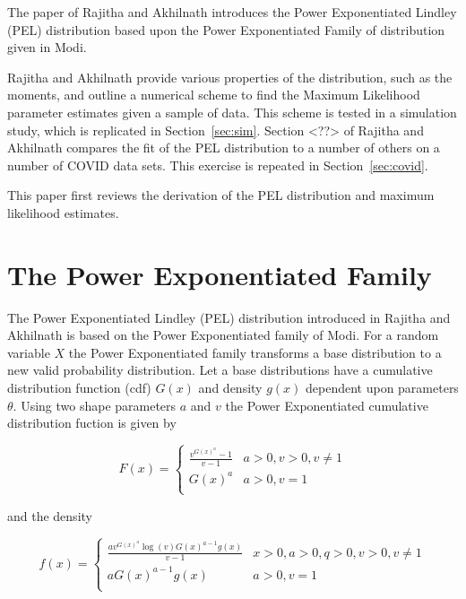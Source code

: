 The paper of Rajitha and Akhilnath\supercite{Rajitha2022} introduces the Power Exponentiated Lindley (PEL) distribution based upon the Power Exponentiated Family of distribution given in Modi\supercite{Modi}.

Rajitha and Akhilnath\supercite{Rajitha2022} provide various properties of the distribution, such as the moments, and outline a numerical scheme to find the Maximum Likelihood parameter estimates given a sample of data. This scheme is tested in a simulation study, which is replicated in Section~\ref{sec:sim}. Section <??> of Rajitha and Akhilnath\supercite{Rajitha2022} compares the fit of the PEL distribution to a number of others on a number of COVID data sets. This exercise is repeated in Section~\ref{sec:covid}.

This paper first reviews the derivation of the PEL distribution and maximum likelihood estimates.


\section{The Power Exponentiated Family}

The Power Exponentiated Lindley (PEL) distribution introduced in Rajitha and Akhilnath\supercite{Rajitha2022} is based on the Power Exponentiated family of Modi\supercite{Modi}. For a random variable $X$ the Power Exponentiated family transforms a base distribution to a new valid probability distribution. Let a base distributions have a cumulative distribution function (cdf) $G\left(x\right)$ and density $g\left(x\right)$ dependent upon parameters $\theta$. Using two shape parameters $a$ and $v$ the Power Exponentiated cumulative distribution fuction is given by

\begin{equation}
  F\left(x\right) = \left\{
    \begin{array}{cl}
      \frac{ v^{G\left(x\right)^{a}} - 1 }{v-1} & a>0,v>0,v\neq1\\
      G\left(x\right)^{a} & a>0,v=1\\
    \end{array}
    \right.
\end{equation}

and the density

\begin{equation}
  f\left(x\right) = \left\{
    \begin{array}{cl}
      \frac{ a v^{G\left(x\right)^{a}} \log\left(v\right) G\left(x\right)^{a-1}g\left(x\right)}{v-1} & x>0,a>0,q>0,v>0,v\neq1\\
      aG\left(x\right)^{a-1}g\left(x\right) & a>0,v=1\\
    \end{array}
    \right.
\end{equation}

